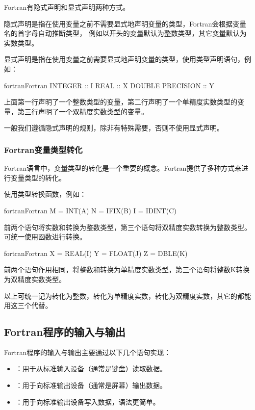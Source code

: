 Fortran有隐式声明和显式声明两种方式。

隐式声明是指在使用变量之前不需要显式地声明变量的类型，Fortran会根据变量名的首字母自动推断类型，
例如以开头的变量默认为整数类型，其它变量默认为实数类型。

显式声明是指在使用变量之前需要显式地声明变量的类型，使用类型声明语句，例如：
\begin{envcode}{fortran}{Fortran}
      INTEGER :: I
      REAL :: X
      DOUBLE PRECISION :: Y
\end{envcode}
上面第一行声明了一个整数类型的变量，第二行声明了一个单精度实数类型的变量，第三行声明了一个双精度实数类型的变量。

一般我们遵循隐式声明的规则，除非有特殊需要，否则不使用显式声明。

\subsubsection{Fortran变量类型转化}
Fortran语言中，变量类型的转化是一个重要的概念。Fortran提供了多种方式来进行变量类型的转化。

使用类型转换函数，例如：
\begin{envcode}{fortran}{Fortran}
      M = INT(A)
      N = IFIX(B)
      I = IDINT(C)
\end{envcode}
前两个语句将实数和转换为整数类型，第三个语句将双精度实数转换为整数类型。可统一使用函数进行转换。

\begin{envcode}{fortran}{Fortran}
      X = REAL(I)
      Y = FLOAT(J)
      Z = DBLE(K)
\end{envcode}
前两个语句作用相同，将整数和转换为单精度实数类型，第三个语句将整数K转换为双精度实数类型。

以上可统一记为转化为整数，转化为单精度实数，转化为双精度实数，其它的都能用这三个代替。

\subsection{Fortran程序的输入与输出}

Fortran程序的输入与输出主要通过以下几个语句实现：

\begin{itemize}
    \item {}：用于从标准输入设备（通常是键盘）读取数据。
    \item {}：用于向标准输出设备（通常是屏幕）输出数据。
    \item {}：用于向标准输出设备写入数据，语法更简单。
\end{itemize}

